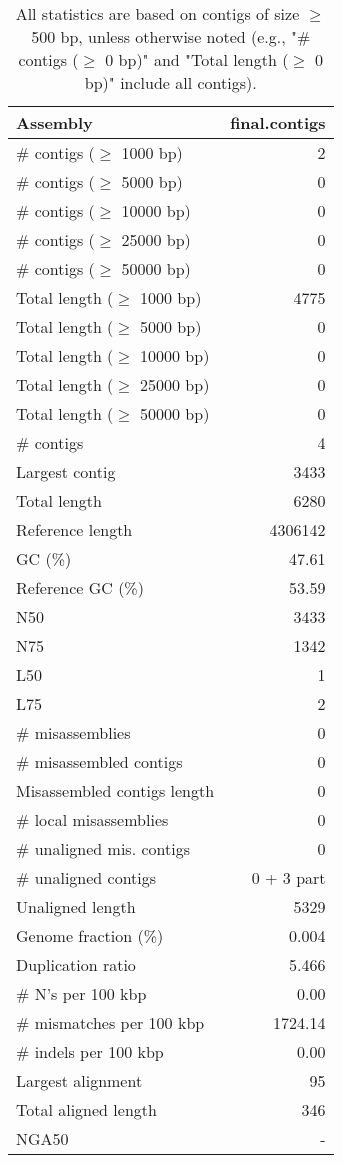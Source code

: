 \documentclass[12pt,a4paper]{article}
\begin{document}
\begin{table}[ht]
\begin{center}
\caption{All statistics are based on contigs of size $\geq$ 500 bp, unless otherwise noted (e.g., "\# contigs ($\geq$ 0 bp)" and "Total length ($\geq$ 0 bp)" include all contigs).}
\begin{tabular}{|l*{1}{|r}|}
\hline
Assembly & final.contigs \\ \hline
\# contigs ($\geq$ 1000 bp) & 2 \\ \hline
\# contigs ($\geq$ 5000 bp) & 0 \\ \hline
\# contigs ($\geq$ 10000 bp) & 0 \\ \hline
\# contigs ($\geq$ 25000 bp) & 0 \\ \hline
\# contigs ($\geq$ 50000 bp) & 0 \\ \hline
Total length ($\geq$ 1000 bp) & 4775 \\ \hline
Total length ($\geq$ 5000 bp) & 0 \\ \hline
Total length ($\geq$ 10000 bp) & 0 \\ \hline
Total length ($\geq$ 25000 bp) & 0 \\ \hline
Total length ($\geq$ 50000 bp) & 0 \\ \hline
\# contigs & 4 \\ \hline
Largest contig & 3433 \\ \hline
Total length & 6280 \\ \hline
Reference length & 4306142 \\ \hline
GC (\%) & 47.61 \\ \hline
Reference GC (\%) & 53.59 \\ \hline
N50 & 3433 \\ \hline
N75 & 1342 \\ \hline
L50 & 1 \\ \hline
L75 & 2 \\ \hline
\# misassemblies & 0 \\ \hline
\# misassembled contigs & 0 \\ \hline
Misassembled contigs length & 0 \\ \hline
\# local misassemblies & 0 \\ \hline
\# unaligned mis. contigs & 0 \\ \hline
\# unaligned contigs & 0 + 3 part \\ \hline
Unaligned length & 5329 \\ \hline
Genome fraction (\%) & 0.004 \\ \hline
Duplication ratio & 5.466 \\ \hline
\# N's per 100 kbp & 0.00 \\ \hline
\# mismatches per 100 kbp & 1724.14 \\ \hline
\# indels per 100 kbp & 0.00 \\ \hline
Largest alignment & 95 \\ \hline
Total aligned length & 346 \\ \hline
NGA50 & - \\ \hline
\end{tabular}
\end{center}
\end{table}
\end{document}

